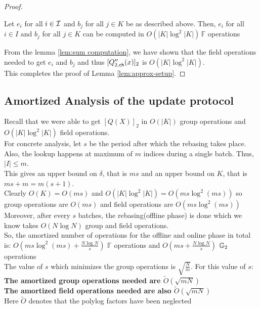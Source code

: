 \begin{proof}
    \begin{lemma}\label{lem:sum computation}
    Let $e_i$ for all $i \in \mathcal{I}$ and $b_j$ for all $j \in K$ be as described above.
    Then, $e_i$ for all $i \in I$ and $b_j$ for all $j \in K$ can be computed in $O(|K|\log^2|K|)\, \mathbb{F}$ operations
    \end{lemma}

    From the lemma \ref{lem:sum computation}, we have shown that the field operations needed to get $e_i$ and $b_j$ and thus $[Q''_{2,\mathsf{ch}}({x})]_2$ is $O(|K|\log^2|K|)$. \\

    This completes the proof of Lemma \ref{lem:approx-setup}.
\end{proof}

\subsection{Amortized Analysis of the update protocol}
Recall that we were able to get $[Q(X)]_2$ in $O(|K|)$ group operations and $O(|K|\log^2|K|)$ field operations. \\
For concrete analysis, let $s$ be the period after which the rebasing takes place. Also, the lookup happens at maximum of $m$ indices during a single batch. Thus, $|I|\leq m$.\\
This gives an upper bound on $\delta$, that is $ms$ and an upper bound on $K$, that is $ms+m=m(s+1)$.\\

Clearly $O(K)=O(ms)$ and $O(|K|\log^2|K|)=O(ms \log^2(ms))$ so group operations are $O(ms)$ and field operations are $O(ms\log^2(ms))$ \\

Moreover, after every $s$ batches, the rebasing(offline phase) is done which we know takes $O(N\log N)$ group and field operations.\\

So, the amortized number of operations for the offline and online phase in total is:
$O(ms \log^2(ms)+\frac{N\log N}{s})$ $\mathbb{F}$ operations and $O(ms +\frac{N\log N}{s})$ $\mathbb{G}_2$ operations\\

The value of $s$ which minimizes the group operations is $\sqrt{\frac{N}{m}}$. For this value of $s$:\\
\textbf{The amortized group operations needed are $\tilde{O}(\sqrt{mN})$}\\
\textbf{The amortized field operations needed are also $\tilde{O}(\sqrt{mN})$}\\
Here $\tilde{O}$ denotes that the polylog factors have been neglected\\\\
